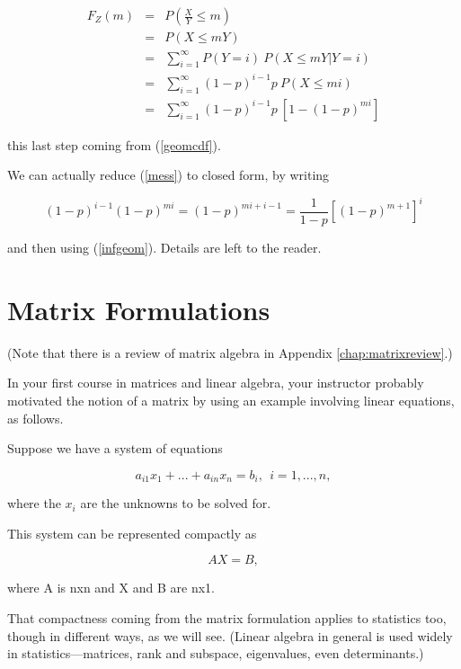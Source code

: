 \begin{eqnarray}
F_Z(m) &=& P \left (\frac{X}{Y} \leq m \right ) \\ 
&=& P(X \leq mY) \\ 
&=& \sum_{i=1}^{\infty} P(Y = i) ~ P(X \leq mY | Y = i) \\
&=& \sum_{i=1}^{\infty} (1-p)^{i-1} p ~ P(X \leq mi) \\
&=& \sum_{i=1}^{\infty} (1-p)^{i-1} p ~ [1 - (1-p)^{mi}]
\label{mess}
\end{eqnarray}

this last step coming from (\ref{geomcdf}).

We can actually reduce (\ref{mess}) to closed form, by writing

\begin{equation}
(1-p)^{i-1} (1-p)^{mi} =  (1-p)^{mi+i-1} = \frac{1}{1-p}
\left [ (1-p)^{m+1} \right ]^i
\end{equation}

and then using (\ref{infgeom}).  Details are left to the reader.

\section{Matrix Formulations}
\label{matrix}

(Note that there is a review of matrix algebra in Appendix
\ref{chap:matrixreview}.)

In your first course in matrices and linear algebra, your instructor
probably motivated the notion of a matrix by using an example involving
linear equations, as follows.

Suppose we have a system of equations

\begin{equation}
\label{linsyst}
a_{i1} x_1 + ... + a_{in} x_{n} = b_i, ~~ i = 1,...,n,
\end{equation}

where the $x_i$ are the unknowns to be solved for.

This system can be represented compactly as

\begin{equation}
\label{lin}
AX = B,
\end{equation}

where A is nxn and X and B are nx1.

That compactness coming from the matrix formulation applies to
statistics too, though in different ways, as we will see.  (Linear
algebra in general is used widely in statistics---matrices, rank and
subspace, eigenvalues, even determinants.)

